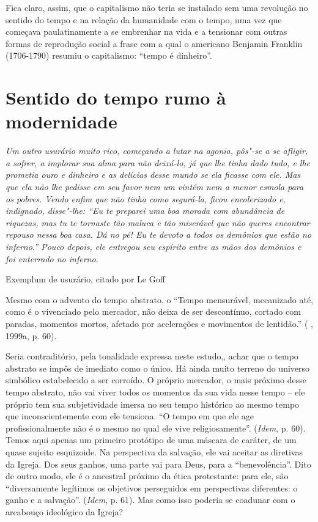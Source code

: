 Fica claro, assim, que o capitalismo não teria se instalado sem uma
revolução no sentido do tempo e na relação da humanidade com o tempo,
uma vez que começava paulatinamente a se embrenhar na vida e a tensionar
com outras formas de reprodução social a frase com a qual o americano
Benjamin Franklin (1706-1790) resumiu o capitalismo: ``tempo é
dinheiro''.

\section{Sentido do tempo rumo à modernidade}

\epigraph{%
\emph{Um outro usurário muito rico, começando a lutar na agonia, pôs"-se a se
afligir, a sofrer, a implorar sua alma para não deixá-lo, já que lhe
tinha dado tudo, e lhe prometia ouro e dinheiro e as delícias desse
mundo se ela ficasse com ele. Mas que ela não lhe pedisse em seu favor
nem um vintém nem a menor esmola para os pobres. Vendo enfim que não
tinha como segurá-la, ficou encolerizado e, indignado, disse"-lhe: ``Eu
te preparei uma boa morada com abundância de riquezas, mas tu te
tornaste tão maluca e tão miserável que não queres encontrar repouso
nessa boa casa. Dá no pé! Eu te devoto a todos os demônios que estão no
inferno.'' Pouco depois, ele entregou seu espírito entre as mãos dos
demônios e foi enterrado no inferno.}}{Exemplum de usurário, citado por Le Goff}

Mesmo com o advento do tempo abstrato, o ``Tempo mensurável, mecanizado
até, como é o vivenciado pelo mercador, não deixa de ser descontínuo, cortado
com paradas, momentos mortos, afetado por acelerações e movimentos de
lentidão.'' ( , 1999a, p. 60).

Seria contraditório, pela tonalidade expressa neste estudo,, achar que o tempo
abstrato se impôs de imediato como o único. Há ainda muito terreno do
universo simbólico estabelecido a ser corroído. O próprio mercador, o
mais próximo desse tempo abstrato, não vai viver todos os momentos da
sua vida nesse tempo -- ele próprio tem sua subjetividade imersa no seu
tempo histórico ao mesmo tempo que inconscientemente com ele tensiona.
``O tempo em que ele age profissionalmente não é o mesmo no qual ele
vive religiosamente''. (\emph{Idem}, p. 60). Temos aqui apenas um
primeiro protótipo de uma máscara de caráter, de um quase sujeito
esquizoide. Na perspectiva da salvação, ele vai aceitar as diretivas da
Igreja. Dos seus ganhos, uma parte vai para Deus, para a
``benevolência''. Dito de outro modo, ele é o ancestral próximo da ética
protestante: para ele, são ``diversamente legítimos os objetivos
perseguidos em perspectivas diferentes: o ganho e a salvação''.
(\emph{Idem}, p. 61). Mas como isso poderia se coadunar com o arcabouço
ideológico da Igreja?

